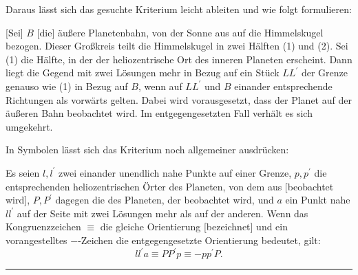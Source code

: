 Daraus lässt sich das gesuchte Kriterium leicht ableiten und wie folgt formulieren:

[Sei] \(B\) [die] äußere Planetenbahn, von der Sonne aus auf die Himmelskugel bezogen. Dieser Großkreis teilt die Himmelskugel in zwei Hälften (1) und (2). Sei (1) die Hälfte, in der der heliozentrische Ort des inneren Planeten erscheint. Dann liegt die Gegend mit zwei Lösungen mehr in Bezug auf ein Stück \(LL^{\prime}\) der Grenze genauso wie (1) in Bezug auf \(B\), wenn auf \(LL^{\prime}\) und \(B\) einander entsprechende Richtungen als vorwärts gelten. Dabei wird vorausgesetzt, dass der Planet auf der äußeren Bahn beobachtet wird. Im entgegengesetzten Fall verhält es sich umgekehrt.

In Symbolen lässt sich das Kriterium noch allgemeiner ausdrücken:

Es seien \(l,l^{\prime}\) zwei einander unendlich nahe Punkte auf einer Grenze, \(p,p^{\prime}\) die entsprechenden heliozentrischen Örter des Planeten, von dem aus [beobachtet wird], \(P,P^{\prime}\) dagegen die des Planeten, der beobachtet wird, und \(a\) ein Punkt nahe \(ll^{\prime}\) auf der Seite mit zwei Lösungen mehr als auf der anderen. Wenn das Kongruenzzeichen \(\equiv\) die gleiche Orientierung [bezeichnet] und ein vorangestelltes \(-\)-Zeichen die entgegengesetzte Orientierung bedeutet, gilt:
\[
ll^{\prime}a\equiv PP^{\prime}p\equiv-pp^{\prime}P.
\]
\begin{center}\rule{.22\textwidth}{.3pt}\end{center}
